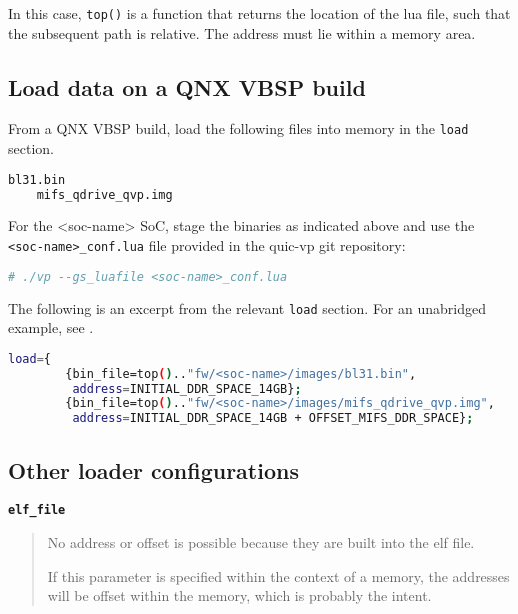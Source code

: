In this case, {\small{\lstinline!top()!}} is a function that returns the location of the lua file, such that the subsequent path is relative. The address must lie within a memory area.


\subsection{Load data on a QNX VBSP build}

From a QNX VBSP build, load the following files into memory in the {\small{\lstinline!load!}} section.

\small
\begin{lstlisting}[language=bash]
    bl31.bin
    mifs_qdrive_qvp.img
\end{lstlisting}
\normalsize

For the <soc-name> SoC, stage the binaries as indicated above and use the {\small{\lstinline!<soc-name>_conf.lua!}} file provided in the quic-vp git repository:

\small
\begin{lstlisting}[language=bash]
    # ./vp --gs_luafile <soc-name>_conf.lua
\end{lstlisting}
\normalsize


The following is an excerpt from the relevant {\small{\lstinline!load!}} section. For an unabridged example, see {}.

\small
\begin{lstlisting}[language=bash]
    load={
        {bin_file=top().."fw/<soc-name>/images/bl31.bin",
         address=INITIAL_DDR_SPACE_14GB};
        {bin_file=top().."fw/<soc-name>/images/mifs_qdrive_qvp.img",
         address=INITIAL_DDR_SPACE_14GB + OFFSET_MIFS_DDR_SPACE};
\end{lstlisting}
\normalsize

\clearpage
\subsection{Other loader configurations}

{\textbf {\footnotesize{\lstinline!elf_file!}}}
\vspace{-2pt}
\begin{quote}
No address or offset is possible because they are built into the elf file.

If this parameter is specified within the context of a memory, the addresses will be offset within the memory, which is probably the intent.
\end{quote}

